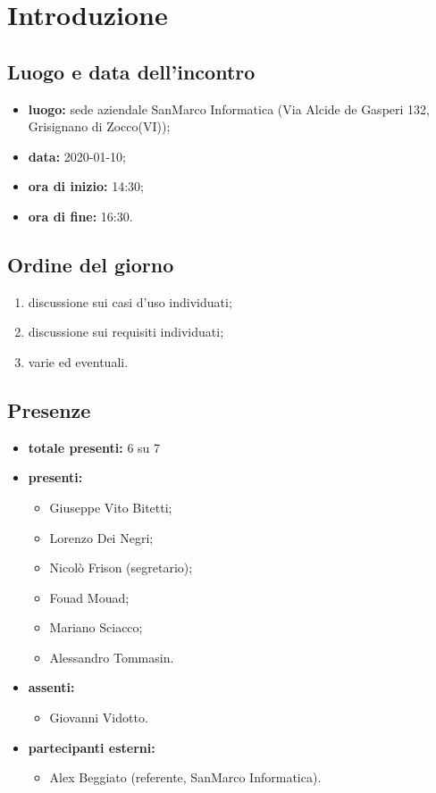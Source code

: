 \section*{Introduzione}

\subsection*{Luogo e data dell'incontro}
	\begin{itemize}
		\item \textbf{luogo:} sede aziendale SanMarco Informatica (Via Alcide de Gasperi 132, Grisignano di Zocco(VI));
		\item \textbf{data:} 2020-01-10;
		\item \textbf{ora di inizio:} 14:30;
		\item \textbf{ora di fine:} 16:30.
	\end{itemize}

\subsection*{Ordine del giorno}
	\begin{enumerate}
		\item discussione sui casi d'uso individuati;
		\item discussione sui requisiti individuati;
		\item varie ed eventuali.
	\end{enumerate}

\subsection*{Presenze}
	\begin{itemize}
		\item \textbf{totale presenti:} 6 su 7
		\item \textbf{presenti: }
			\begin{itemize}			
				\item Giuseppe Vito Bitetti;
				\item Lorenzo Dei Negri;
				\item Nicolò Frison (segretario);
				\item Fouad Mouad;
				\item Mariano Sciacco;
				\item Alessandro Tommasin.
			\end{itemize}
		\item \textbf{assenti: } 
			\begin{itemize}	
				\item Giovanni Vidotto.
			\end{itemize}
		\item \textbf{partecipanti esterni:}
			\begin{itemize}
				\item Alex Beggiato (referente, SanMarco Informatica).
			\end{itemize}
	\end{itemize}


